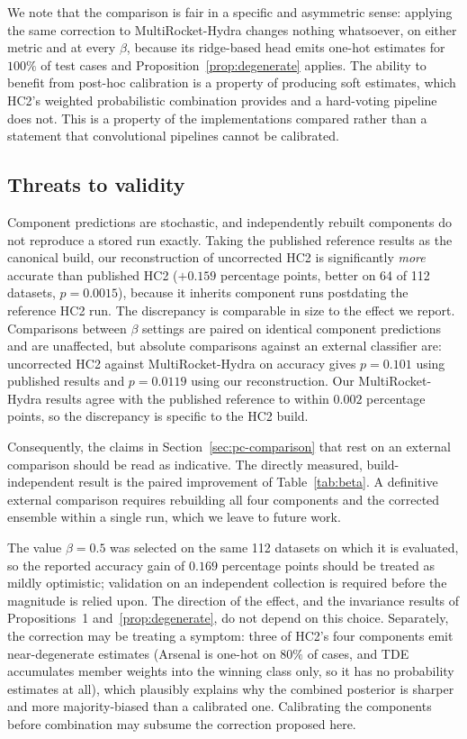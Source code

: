 We note that the comparison is fair in a specific and asymmetric sense:
applying the same correction to MultiRocket-Hydra changes nothing whatsoever, on either
metric and at every $\beta$, because its ridge-based head emits one-hot estimates for
$100\%$ of test cases and Proposition~\ref{prop:degenerate} applies. The ability to
benefit from post-hoc calibration is a property of producing soft estimates, which HC2's
weighted probabilistic combination provides and a hard-voting pipeline does not. This is
a property of the implementations compared rather than a statement that convolutional
pipelines cannot be calibrated.

\subsection{Threats to validity}
\label{sec:pc-threats}

Component predictions are stochastic, and independently rebuilt components do not
reproduce a stored run exactly. Taking the published reference results as the canonical
build, our reconstruction of uncorrected HC2 is significantly \emph{more} accurate than
published HC2 ($+0.159$ percentage points, better on 64 of 112 datasets, $p=0.0015$),
because it inherits component runs postdating the reference HC2 run. The discrepancy is
comparable in size to the effect we report. Comparisons between $\beta$ settings are
paired on identical component predictions and are unaffected, but absolute comparisons
against an external classifier are: uncorrected HC2 against MultiRocket-Hydra on accuracy
gives $p=0.101$ using published results and $p=0.0119$ using our reconstruction. Our
MultiRocket-Hydra results agree with the published reference to within $0.002$ percentage
points, so the discrepancy is specific to the HC2 build.

Consequently, the claims in Section~\ref{sec:pc-comparison} that rest on an external
comparison should be read as indicative. The directly measured, build-independent result
is the paired improvement of Table~\ref{tab:beta}. A definitive external comparison
requires rebuilding all four components and the corrected ensemble within a single run,
which we leave to future work.

The value $\beta = 0.5$ was selected on the same 112 datasets on which it is evaluated,
so the reported accuracy gain of $0.169$ percentage points should be treated as mildly
optimistic; validation on an independent collection is required before the magnitude is
relied upon. The direction of the effect, and the invariance results of Propositions~1
and~\ref{prop:degenerate}, do not depend on this choice. Separately, the correction may
be treating a symptom: three of HC2's four components emit near-degenerate estimates
(Arsenal is one-hot on $80\%$ of cases, and TDE accumulates member weights into the
winning class only, so it has no probability estimates at all), which plausibly explains
why the combined posterior is sharper and more majority-biased than a calibrated one.
Calibrating the components before combination may subsume the correction proposed here.
